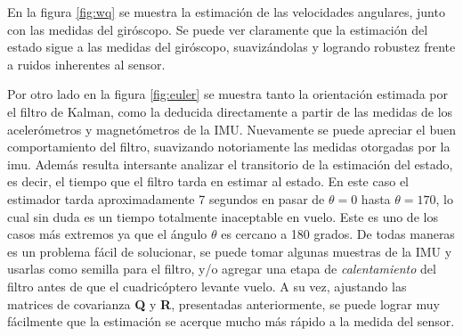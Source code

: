 \documentclass[main]{subfiles}
\begin{document}
\begin{figure} [h!]
\centering
   \hspace{10pt}
  \caption{}
  \label{fig:posyvel}
\end{figure}

En la figura \ref{fig:wq} se muestra la estimación de las velocidades angulares, junto con las medidas del giróscopo. Se puede ver claramente que la estimación del estado sigue a las medidas del giróscopo, suavizándolas y logrando robustez frente a ruidos inherentes al sensor.

Por otro lado en la figura \ref{fig:euler} se muestra tanto la orientación estimada por el filtro de Kalman, como la deducida directamente a partir de las medidas de los acelerómetros y magnetómetros de la IMU. Nuevamente se puede apreciar el buen comportamiento del filtro, suavizando notoriamente las medidas otorgadas por la imu. Además resulta intersante analizar el transitorio de la estimación del estado, es decir, el tiempo que el filtro tarda en estimar al estado. En este caso el estimador tarda aproximadamente 7 segundos en pasar de $\theta = 0$ hasta $\theta = 170$, lo cual sin duda es un tiempo totalmente inaceptable en vuelo. Este es uno de los casos más extremos ya que el ángulo $\theta$ es cercano a 180 grados. De todas maneras es un problema fácil de solucionar, se puede tomar algunas muestras de la IMU y usarlas como semilla para el filtro, y/o agregar una etapa de \emph{calentamiento} del filtro antes de que el cuadricóptero levante vuelo. A su vez, ajustando las matrices de covarianza \textbf{Q} y \textbf{R}, presentadas anteriormente, se puede lograr muy fácilmente que la estimación se acerque mucho más rápido a la medida del sensor.\\
\end{document}
